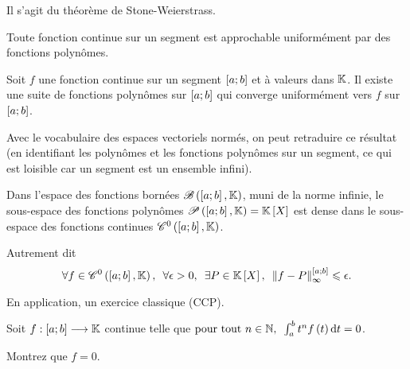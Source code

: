 Il s'agit du théorème de Stone-Weierstrass.

\begin{theo}
Toute fonction continue sur un segment est approchable uniformément par des fonctions polynômes.

Soit \(f\) une fonction continue sur un segment \(\left[a;b\right]\) et à valeurs dans \(\mathbb{K}\). Il existe une suite de fonctions polynômes sur \(\left[a;b\right]\) qui converge uniformément vers \(f\) sur \(\left[a;b\right]\).
\end{theo}

Avec le vocabulaire des espaces vectoriels normés, on peut retraduire ce résultat (en identifiant les polynômes et les fonctions polynômes sur un segment, ce qui est loisible car un segment est un ensemble infini).

\begin{prop}
Dans l'espace des fonctions bornées \(\fonctionsbornees[\intervii{a}{b}][\K]\), muni de la norme infinie, le sous-espace des fonctions polynômes \(\fonctionspolynomes[\intervii{a}{b}][\K]=\poly\) est dense dans le sous-espace des fonctions continues \(\mathscr{C}^{0}\left(\left[a;b\right],\mathbb{K}\right)\).

Autrement dit \[\quantifs{\forall f\in\ensclasse{0}{\intervii{a}{b}}{\K};\forall\epsilon>0;\exists P\in\poly}\norme{f-P}_\infty^{\intervii{a}{b}}\leq\epsilon.\]
\end{prop}

En application, un exercice classique (CCP).

\begin{exo}
Soit \(f:\left[a;b\right]\longrightarrow\mathbb{K}\) continue telle que \(\quantifs{\tpt n\in\N}\int_a^bt^nf\paren{t}\odif{t}=0\).

Montrez que \(f=0\).
\end{exo}

